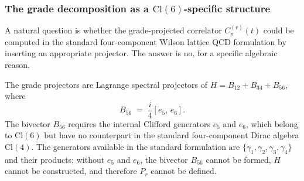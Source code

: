 \documentclass[12pt]{article}
\theoremstyle{definition}
\theoremstyle{remark}
\newcommand{\cl}{\mathrm{Cl}}           %
\begin{document}
	\subsubsection{The grade decomposition as a \texorpdfstring{$\cl(6)$}{Cl(6)}-specific
		structure}
	\label{sec:cl6-specific}
	
	A natural question is whether the grade-projected correlator $C_\pi^{(r)}(t)$
	could be computed in the standard four-component Wilson lattice QCD formulation
	by inserting an appropriate projector.  The answer is no, for a specific
	algebraic reason.
	
	The grade projectors are Lagrange spectral projectors of
	$H = B_{12}+B_{34}+B_{56}$, where
	\begin{equation}
		B_{56} \;=\; \frac{i}{4}[e_5,\, e_6].
		\label{eq:B56}
	\end{equation}
	The bivector $B_{56}$ requires the internal Clifford generators $e_5$ and
	$e_6$, which belong to $\cl(6)$ but have no counterpart in the standard
	four-component Dirac algebra $\cl(4)$.  The generators available in the
	standard formulation are $\{\gamma_1,\gamma_2,\gamma_3,\gamma_4\}$ and their
	products; without $e_5$ and $e_6$, the bivector $B_{56}$ cannot be formed,
	$H$ cannot be constructed, and therefore $P_r$ cannot be defined.
	
\end{document}

